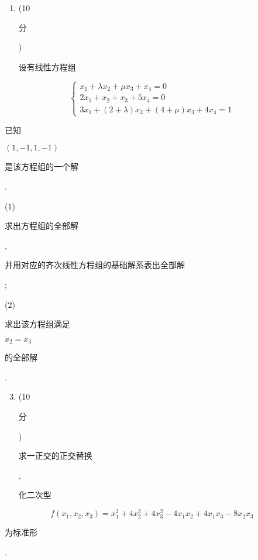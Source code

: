 \documentclass[10pt]{article}
\begin{document}
\begin{enumerate}
  \item (10 \begin{CJK}{UTF8}{mj}分\end{CJK}) \begin{CJK}{UTF8}{mj}设有线性方程组\end{CJK}
\end{enumerate}
$$
\left\{\begin{array}{l}
x_{1}+\lambda x_{2}+\mu x_{3}+x_{4}=0 \\
2 x_{1}+x_{2}+x_{3}+5 x_{4}=0 \\
3 x_{1}+(2+\lambda) x_{2}+(4+\mu) x_{3}+4 x_{4}=1
\end{array}\right.
$$
\begin{CJK}{UTF8}{mj}已知\end{CJK} $(1,-1,1,-1)$ \begin{CJK}{UTF8}{mj}是该方程组的一个解\end{CJK}.

(1) \begin{CJK}{UTF8}{mj}求出方程组的全部解\end{CJK}, \begin{CJK}{UTF8}{mj}并用对应的齐次线性方程组的基础解系表出全部解\end{CJK};

(2) \begin{CJK}{UTF8}{mj}求出该方程组满足\end{CJK} $x_{2}=x_{3}$ \begin{CJK}{UTF8}{mj}的全部解\end{CJK}.

\begin{enumerate}
  \setcounter{enumi}{2}
  \item (10 \begin{CJK}{UTF8}{mj}分\end{CJK}) \begin{CJK}{UTF8}{mj}求一正交的正交替换\end{CJK}, \begin{CJK}{UTF8}{mj}化二次型\end{CJK}
\end{enumerate}
$$
f\left(x_{1}, x_{2}, x_{3}\right)=x_{1}^{2}+4 x_{2}^{2}+4 x_{3}^{2}-4 x_{1} x_{2}+4 x_{1} x_{3}-8 x_{2} x_{3}
$$
\begin{CJK}{UTF8}{mj}为标准形\end{CJK}.
\end{document}
